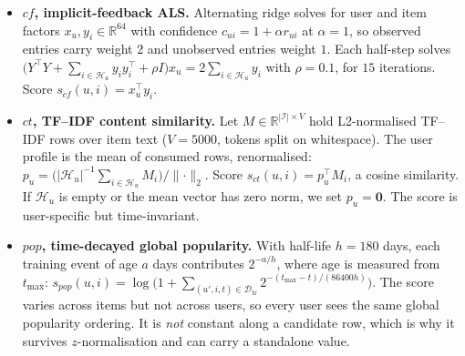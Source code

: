 \documentclass[pdflatex,sn-basic,Numbered]{sn-jnl}
\theoremstyle{plain}
\theoremstyle{definition}
\begin{document}
\begin{itemize}
\item \textbf{$cf$, implicit-feedback ALS.} Alternating ridge solves for user
      and item factors $x_u, y_i \in \mathbb{R}^{64}$ with confidence
      $c_{ui} = 1 + \alpha r_{ui}$ at $\alpha = 1$, so observed entries carry
      weight $2$ and unobserved entries weight $1$. Each half-step solves
      $\bigl(Y^\top Y + \sum_{i \in \mathcal{H}_u} y_i y_i^\top + \rho I\bigr)
      x_u = 2\sum_{i \in \mathcal{H}_u} y_i$ with $\rho = 0.1$, for $15$
      iterations. Score $s_{cf}(u,i) = x_u^\top y_i$.

\item \textbf{$ct$, TF--IDF content similarity.} Let $M \in
      \mathbb{R}^{|\mathcal{I}| \times V}$ hold L2-normalised TF--IDF rows over
      item text ($V = 5000$, tokens split on whitespace). The user profile is
      the mean of consumed rows, renormalised:
      $p_u = \bigl(|\mathcal{H}_u|^{-1}\sum_{i \in \mathcal{H}_u} M_i\bigr) /
      \lVert \cdot \rVert_2$. Score $s_{ct}(u,i) = p_u^\top M_i$, a cosine
      similarity. If $\mathcal H_u$ is empty or the mean vector has zero norm,
      we set $p_u=\mathbf 0$. The score is user-specific but time-invariant.

\item \textbf{$pop$, time-decayed global popularity.} With half-life
      $h = 180$ days, each training event of age $a$ days contributes
      $2^{-a/h}$, where age is measured from $t_{\max}$:
      $s_{pop}(u,i) = \log\bigl(1 + \sum_{(u',i,t) \in \mathcal{D}_{\mathrm{tr}}}
      2^{-(t_{\max}-t)/(86400 h)}\bigr)$. The score varies across items but not across
      users, so every user sees the same global popularity ordering. It is
      \emph{not} constant along a candidate row, which is why it survives
      $z$-normalisation and can carry a standalone value.


\end{itemize}
\end{document}
